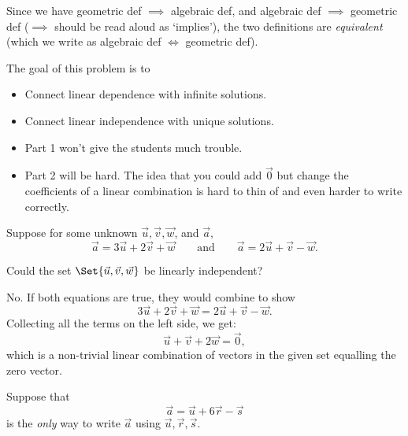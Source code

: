 \documentclass{problemset}
\newcommand{\bookonlynewpage}{\begin{bookonly}\newpage\end{bookonly}}
\begin{document}
	Since we have geometric def $\implies$ algebraic def, and algebraic def $\implies$ geometric def
	($\implies$ should be read aloud as `implies'), the two definitions
	are \emph{equivalent} (which we write as algebraic def $\iff$ geometric def).


	\bookonlynewpage
	\question
	\begin{annotation}
		\begin{goals}

			The goal of this problem is to
			\begin{itemize}
				\item Connect linear dependence with infinite solutions.
				\item Connect linear independence with unique solutions.
			\end{itemize}
		\end{goals}

		\begin{notes}
			\begin{itemize}
				\item Part 1 won't give the students much trouble.
				\item Part 2 will be hard. The idea that you could add $\vec 0$
					but change the coefficients of a linear combination
					is hard to thin of and even harder to write correctly.
			\end{itemize}
		\end{notes}
	\end{annotation}
	Suppose for some unknown $\vec u, \vec v, \vec w$, and $\vec a$,
	\[
		\vec a = 3\vec u+2\vec v +\vec w\qquad \text{and}\qquad
		\vec a = 2\vec u+\vec v -\vec w.
	\]
	\begin{parts}
		\item Could the set $\Set{\vec u,\vec v,\vec w}$ be linearly
		independent?
			\begin{solution}
				No. If both equations are true, they would combine to show
				\[
					3\vec u+2\vec v +\vec w = 2\vec u+\vec v -\vec w.
				\]
				Collecting all the terms on the left side, we get:
				\[
					\vec u + \vec v + 2\vec w = \vec 0,
				\]
				which is a non-trivial linear combination of vectors in the given
				set equalling the zero vector.
			\end{solution}
	\end{parts}
	Suppose that
	\[
		\vec a = \vec u+6\vec r-\vec s
	\]
	is the \emph{only} way to write $\vec a$ using $\vec u,\vec r,\vec s$.
\end{document}
